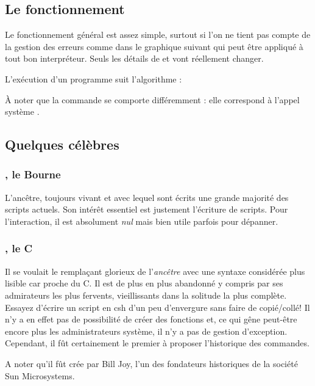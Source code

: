 \subsection{Le fonctionnement}
Le fonctionnement général est assez simple, surtout si l'on ne tient pas compte de la gestion des erreurs comme dans le graphique suivant qui peut être appliqué à tout bon interpréteur. Seuls les détails de  et  vont réellement changer.

L'exécution d'un programme suit l'algorithme :

À noter que la commande  se comporte différemment : elle correspond à l'appel système .

\subsection{Quelques \shells{} célèbres}
\subsubsection{\sh{}, le Bourne \shell{}}
L'ancêtre, toujours vivant et avec lequel sont écrits une grande majorité des scripts actuels. Son intérêt essentiel est justement l'écriture de scripts. Pour l'interaction, il est absolument \emph{nul} mais bien utile parfois pour dépanner.

\subsubsection{\csh{}, le C \shell{}}
Il se voulait le remplaçant glorieux de l'\emph{ancêtre} \sh{} avec une syntaxe considérée plus lisible car proche du C. Il est de plus en plus abandonné y compris par ses admirateurs les plus fervents, vieillissants dans la solitude la plus complète. Essayez d'écrire un script en csh d'un peu d'envergure sans faire de copié/collé! Il n'y a en effet pas de possibilité de créer des fonctions et, ce qui gêne peut-être encore plus les administrateurs système, il n'y a pas de gestion d'exception.  Cependant, il fût certainement le premier à proposer l'historique des commandes.

A noter qu'il fût crée par Bill Joy, l'un des fondateurs historiques de la société Sun Microsystems.

